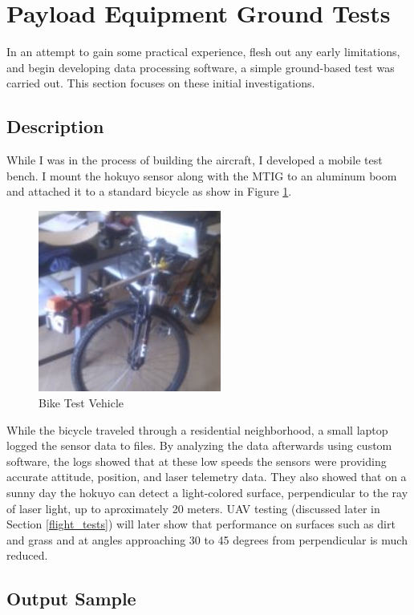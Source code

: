 \documentclass[a4paper,11pt]{report}
\begin{document}
\section{Payload Equipment Ground Tests}

In an attempt to gain some practical experience, flesh out any early limitations, and begin developing data processing software, a simple ground-based test was carried out. This section focuses on these initial investigations.

\subsection{Description}

While I was in the process of building the aircraft, I developed a mobile test bench. I mount the hokuyo sensor along with the MTIG to an aluminum boom and attached it to a standard bicycle as show in Figure \ref{fig:bike}. 

\begin{figure}[ht]
 \centering
 \includegraphics[width=6cm]{Bikesciencepackage.jpg}
 \caption{Bike Test Vehicle}
 \label{fig:bike}
\end{figure}

While the bicycle traveled through a residential neighborhood, a small laptop logged the sensor data to files. By analyzing the data afterwards using custom software, the logs showed that at these low speeds the sensors were providing accurate attitude, position, and laser telemetry data. They also showed that on a sunny day the hokuyo can detect a light-colored surface, perpendicular to the ray of laser light, up to aproximately 20 meters. UAV testing (discussed later in Section \ref{flight_tests}) will later show that performance on surfaces such as dirt and grass and at angles approaching 30 to 45 degrees from perpendicular is much reduced.

\subsection{Output Sample}
\end{document}
